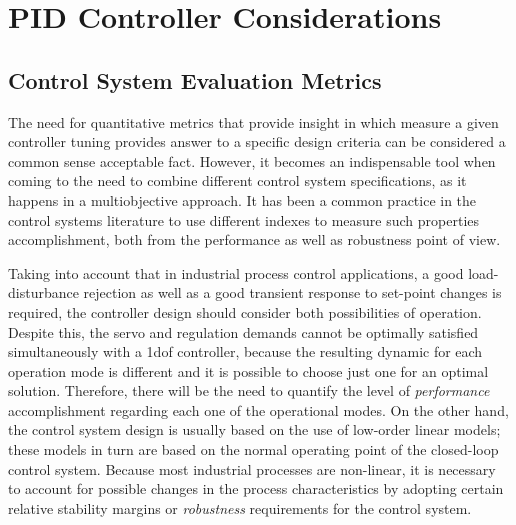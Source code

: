 \chapter{PID Controller Considerations}
\label{chap:PIDControllerConsideration}

\section{Control System Evaluation Metrics}
%
The need for quantitative metrics that provide insight in which measure a given controller tuning provides answer to a specific design criteria can be considered a common sense acceptable fact. However, it becomes an indispensable tool when coming to the need to combine different control system specifications, as it happens in a multiobjective approach.  It has been a common practice in the control systems literature to use different indexes to measure such properties accomplishment, both from the performance as well as robustness point of view.

Taking into account that in industrial process control applications, a good load-disturbance rejection as well as a good transient response to set-point changes is required, the controller design should consider both possibilities of operation. Despite this, the servo and regulation demands cannot be optimally satisfied simultaneously with a \gls{1dof} controller, because the resulting dynamic for each operation mode is different and it is possible to choose just one for an optimal solution. Therefore, there will be the need to quantify the level of \emph{performance} accomplishment regarding each one of the operational modes. On the other hand, the control system design is usually based on the use of low-order linear models; these models in turn are based on the normal operating point of the closed-loop control system. Because most industrial processes are non-linear, it is necessary to account for possible changes in the process characteristics by adopting certain relative stability margins or \emph{robustness} requirements for the control system.

